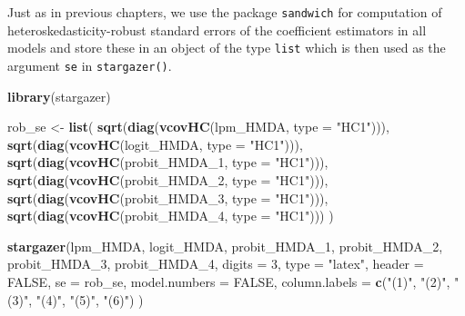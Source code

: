 \documentclass[]{book}
\newenvironment{Shaded}{\begin{snugshade}}{\end{snugshade}}
\newcommand{\KeywordTok}[1]{\textcolor[rgb]{0.13,0.29,0.53}{\textbf{#1}}}
\newcommand{\DataTypeTok}[1]{\textcolor[rgb]{0.13,0.29,0.53}{#1}}
\newcommand{\DecValTok}[1]{\textcolor[rgb]{0.00,0.00,0.81}{#1}}
\newcommand{\StringTok}[1]{\textcolor[rgb]{0.31,0.60,0.02}{#1}}
\newcommand{\OtherTok}[1]{\textcolor[rgb]{0.56,0.35,0.01}{#1}}
\newcommand{\NormalTok}[1]{#1}
\theoremstyle{definition}
\theoremstyle{definition}
\theoremstyle{definition}
\theoremstyle{remark}
\begin{document}
Just as in previous chapters, we use the package \texttt{sandwich} for
computation of heteroskedasticity-robust standard errors of the
coefficient estimators in all models and store these in an object of the
type \texttt{list} which is then used as the argument \texttt{se} in
\texttt{stargazer()}.

\begin{Shaded}
\begin{Highlighting}[]
\KeywordTok{library}\NormalTok{(stargazer)}

\NormalTok{rob_se <-}\StringTok{ }\KeywordTok{list}\NormalTok{(}
  \KeywordTok{sqrt}\NormalTok{(}\KeywordTok{diag}\NormalTok{(}\KeywordTok{vcovHC}\NormalTok{(lpm_HMDA, }\DataTypeTok{type =} \StringTok{"HC1"}\NormalTok{))),}
  \KeywordTok{sqrt}\NormalTok{(}\KeywordTok{diag}\NormalTok{(}\KeywordTok{vcovHC}\NormalTok{(logit_HMDA, }\DataTypeTok{type =} \StringTok{"HC1"}\NormalTok{))),}
  \KeywordTok{sqrt}\NormalTok{(}\KeywordTok{diag}\NormalTok{(}\KeywordTok{vcovHC}\NormalTok{(probit_HMDA_}\DecValTok{1}\NormalTok{, }\DataTypeTok{type =} \StringTok{"HC1"}\NormalTok{))),}
  \KeywordTok{sqrt}\NormalTok{(}\KeywordTok{diag}\NormalTok{(}\KeywordTok{vcovHC}\NormalTok{(probit_HMDA_}\DecValTok{2}\NormalTok{, }\DataTypeTok{type =} \StringTok{"HC1"}\NormalTok{))),}
  \KeywordTok{sqrt}\NormalTok{(}\KeywordTok{diag}\NormalTok{(}\KeywordTok{vcovHC}\NormalTok{(probit_HMDA_}\DecValTok{3}\NormalTok{, }\DataTypeTok{type =} \StringTok{"HC1"}\NormalTok{))),}
  \KeywordTok{sqrt}\NormalTok{(}\KeywordTok{diag}\NormalTok{(}\KeywordTok{vcovHC}\NormalTok{(probit_HMDA_}\DecValTok{4}\NormalTok{, }\DataTypeTok{type =} \StringTok{"HC1"}\NormalTok{)))}
\NormalTok{)}

\KeywordTok{stargazer}\NormalTok{(lpm_HMDA, logit_HMDA, probit_HMDA_}\DecValTok{1}\NormalTok{, probit_HMDA_}\DecValTok{2}\NormalTok{, probit_HMDA_}\DecValTok{3}\NormalTok{, probit_HMDA_}\DecValTok{4}\NormalTok{,  }
          \DataTypeTok{digits =} \DecValTok{3}\NormalTok{,}
          \DataTypeTok{type =} \StringTok{"latex"}\NormalTok{, }
          \DataTypeTok{header =} \OtherTok{FALSE}\NormalTok{,}
          \DataTypeTok{se =}\NormalTok{ rob_se,}
          \DataTypeTok{model.numbers =} \OtherTok{FALSE}\NormalTok{,}
          \DataTypeTok{column.labels =} \KeywordTok{c}\NormalTok{(}\StringTok{"(1)"}\NormalTok{, }\StringTok{"(2)"}\NormalTok{, }\StringTok{"(3)"}\NormalTok{, }\StringTok{"(4)"}\NormalTok{, }\StringTok{"(5)"}\NormalTok{, }\StringTok{"(6)"}\NormalTok{)}
\NormalTok{          )}
\end{Highlighting}
\end{Shaded}
\end{document}
